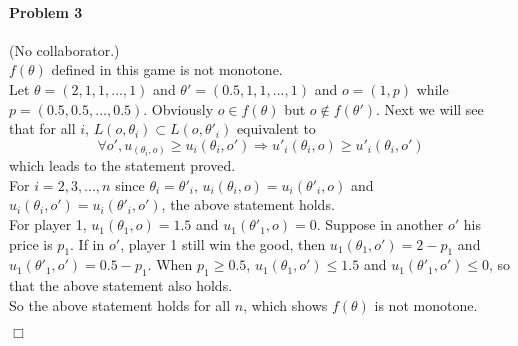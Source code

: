 \documentclass[12pt]{article}
\newenvironment{proof}{\noindent{\em Proof.} \hspace*{1mm}}{
\hspace*{\fill} $\Box$ }
\begin{document}
\paragraph{Problem 3} (No collaborator.)
\\
$f(\theta)$ defined in this game is not monotone.
\\
\begin{proof}
Let $\theta=(2,1,1,...,1)$
and $\theta'=(0.5,1,1,...,1)$
and $o=(1,p)$ while $p=(0.5,0.5,...,0.5)$.
Obviously $o \in f(\theta)$ but $o \not\in f(\theta')$.
Next we will see that for all $i$, $L(o,\theta_i) \subset L(o,\theta'_i)$ equivalent to
$$\forall o', u_(\theta_i,o) \geq u_i(\theta_i,o') \Rightarrow u'_i(\theta_i,o) \geq u'_i(\theta_i,o')$$
which leads to the statement proved.
\\
For $i=2,3,...,n$ since
$\theta_i=\theta'_i$,
$u_i(\theta_i,o)=u_i(\theta'_i,o)$
and $u_i(\theta_i,o')=u_i(\theta'_i,o')$,
the above statement holds.
\\
For player 1, $u_1(\theta_1,o)=1.5$ and $u_1(\theta'_1,o)=0$.
Suppose in another $o'$ his price is $p_1$.
If in $o'$, player 1 still win the good, then $u_1(\theta_1,o')=2-p_1$ and  $u_1(\theta'_1,o')=0.5-p_1$.
When $p_1\geq 0.5$, $u_1(\theta_1,o') \leq 1.5$ and $u_1(\theta'_1,o') \leq 0$,
so that the above statement also holds.
\\
So the above statement holds for all $n$, which shows $f(\theta)$ is not monotone.
\end{proof}



\begin{thebibliography}{99}



\end{thebibliography}
\end{document}
